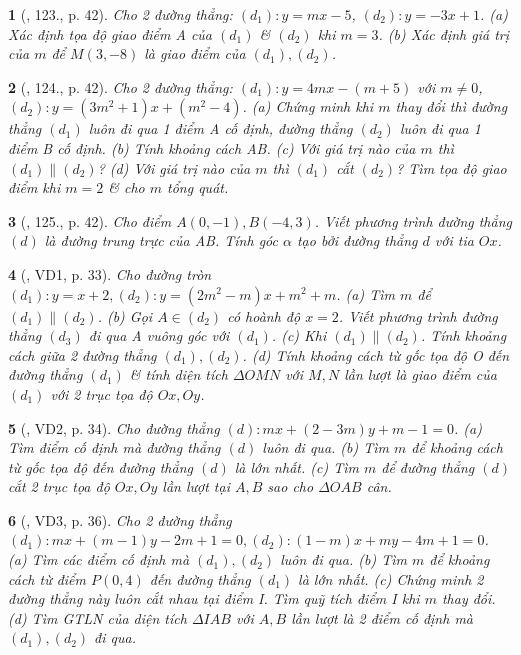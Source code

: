 \documentclass{article}
\newtheorem{baitoan}{}
\begin{document}
\begin{baitoan}[\cite{Tuyen_Toan_9_old}, 123., p. 42]
	Cho 2 đường thẳng: $(d_1): y = mx - 5$, $(d_2):y = -3x + 1$. (a) Xác định tọa độ giao điểm A của $(d_1)$ \& $(d_2)$ khi $m = 3$. (b) Xác định giá trị của $m$ để $M(3,-8)$ là giao điểm của $(d_1),(d_2)$.
\end{baitoan}

\begin{baitoan}[\cite{Tuyen_Toan_9_old}, 124., p. 42]
	Cho 2 đường thẳng: $(d_1):y = 4mx - (m + 5)$ với $m\ne0$, $(d_2):y = (3m^2 + 1)x + (m^2 - 4)$. (a) Chứng minh khi $m$ thay đổi thì đường thẳng $(d_1)$ luôn đi qua 1 điểm A cố định, đường thẳng $(d_2)$ luôn đi qua 1 điểm B cố định. (b) Tính khoảng cách AB. (c) Với giá trị nào của $m$ thì $(d_1)\parallel(d_2)$? (d) Với giá trị nào của $m$ thì $(d_1)$ cắt $(d_2)$? Tìm tọa độ giao điểm khi $m = 2$ \& cho $m$ tổng quát.
\end{baitoan}

\begin{baitoan}[\cite{Tuyen_Toan_9_old}, 125., p. 42]
	Cho điểm $A(0,-1),B(-4,3)$. Viết phương trình đường thẳng $(d)$ là đường trung trực của AB. Tính góc $\alpha$ tạo bởi đường thẳng $d$ với tia $Ox$.
\end{baitoan}

\begin{baitoan}[\cite{Kien_dai_so_9}, VD1, p. 33]
	Cho đường tròn $(d_1):y = x + 2,(d_2):y = (2m^2 - m)x + m^2 + m$. (a) Tìm $m$ để $(d_1)\parallel(d_2)$. (b) Gọi $A\in(d_2)$ có hoành độ $x = 2$. Viết phương trình đường thẳng $(d_3)$ đi qua A vuông góc với $(d_1)$. (c) Khi $(d_1)\parallel(d_2)$. Tính khoảng cách giữa 2 đường thẳng $(d_1),(d_2)$. (d) Tính khoảng cách từ gốc tọa độ O đến đường thẳng $(d_1)$ \& tính diện tích $\Delta OMN$ với $M,N$ lần lượt là giao điểm của $(d_1)$ với 2 trục tọa độ $Ox,Oy$.
\end{baitoan}

\begin{baitoan}[\cite{Kien_dai_so_9}, VD2, p. 34]
	Cho đường thẳng $(d):mx + (2 - 3m)y + m - 1 = 0$. (a) Tìm điểm cố định mà đường thẳng $(d)$ luôn đi qua. (b) Tìm $m$ để khoảng cách từ gốc tọa độ đến đường thẳng $(d)$ là lớn nhất. (c) Tìm $m$ để đường thẳng $(d)$ cắt 2 trục tọa độ $Ox,Oy$ lần lượt tại $A,B$ sao cho $\Delta OAB$ cân.
\end{baitoan}

\begin{baitoan}[\cite{Kien_dai_so_9}, VD3, p. 36]
	Cho 2 đường thẳng $(d_1):mx + (m - 1)y - 2m + 1 = 0,(d_2):(1 - m)x + my - 4m + 1 = 0$. (a) Tìm các điểm cố định mà $(d_1),(d_2)$ luôn đi qua. (b) Tìm $m$ để khoảng cách từ điểm $P(0,4)$ đến đường thẳng $(d_1)$ là lớn nhất. (c) Chứng minh 2 đường thẳng này luôn cắt nhau tại điểm I. Tìm quỹ tích điểm I khi $m$ thay đổi. (d) Tìm {\rm GTLN} của diện tích $\Delta IAB$ với $A,B$ lần lượt là 2 điểm cố định mà $(d_1),(d_2)$ đi qua.
\end{baitoan}
\end{document}
